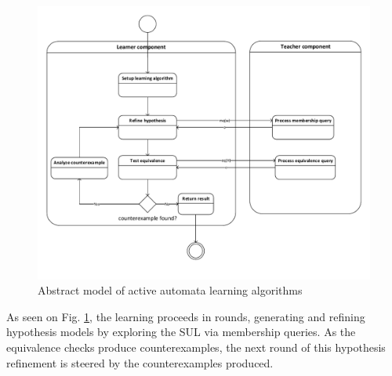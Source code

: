 \begin{figure}[H]
	\centering
	\includegraphics[width=1.0\linewidth]{figures/flowchartlearning}
	\caption{Abstract model of active automata learning algorithms}
	\label{fig:flowchartlearning}
\end{figure}

As seen on Fig. \ref{fig:flowchartlearning}, the learning proceeds in rounds, generating and refining hypothesis models by exploring the SUL via membership queries. As the equivalence checks produce counterexamples, the next round of this hypothesis refinement is steered by the counterexamples produced.

